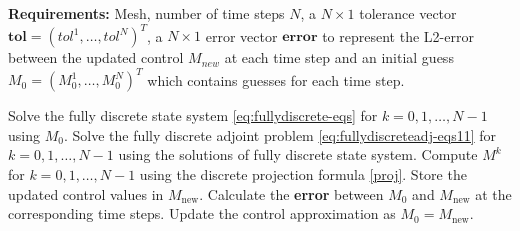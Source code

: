 \documentclass{amsart}
\newcommand{\jjl}[1]{\textcolor{purple}{JJL: #1}}
\begin{document}
\begin{algorithm}
	\caption{}
	\textbf{Requirements:} Mesh, number of time steps $N$, a $N\times 1$ tolerance vector $\boldsymbol{tol} = (tol^{1},\ldots,tol^{N})^{T}$, a $N\times 1$ error vector $\boldsymbol{error}$ to represent the L2-error between the updated control $M_{new}$ %
    at each time step and an initial guess $M_{0} = (M_{0}^{1},\ldots,M_{0}^{N})^{T}$ which contains guesses for each time step.
	\begin{algorithmic}[1]\label{alg1}
		\State Solve the fully discrete state system \eqref{eq:fullydiscrete-eqs} for $k=0,1,\ldots,N-1$ using $M_{0}$.
		\State Solve the fully discrete adjoint problem \eqref{eq:fullydiscreteadj-eqs11} for $k=0,1,\ldots,N-1$ using the 
		\Statex\hspace{\algorithmicindent}solutions of fully discrete state system.
		\State Compute $M^{k}$ for $k=0,1,\ldots,N-1$ using the discrete projection formula \eqref{proj}.
		\State Store the updated control values in $M_{\text{new}}$. 
		\State Calculate the \textbf{error} between $M_{0}$ and $M_{\text{new}}$ at the corresponding time steps. 
		\State Update the control approximation as $M_{0} = M_{\text{new}}$.
		\EndWhile
	\end{algorithmic}
\end{algorithm}
\end{document}
